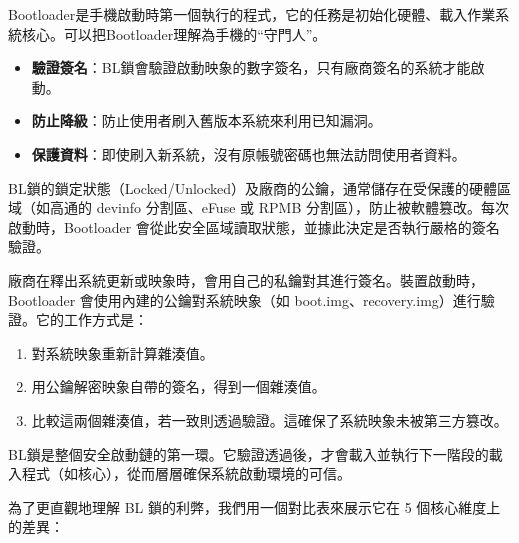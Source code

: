 


Bootloader是手機啟動時第一個執行的程式，它的任務是初始化硬體、載入作業系統核心。可以把Bootloader理解為手機的“守門人”。


\begin{itemize}
  \item \textbf{驗證簽名}：BL鎖會驗證啟動映象的數字簽名，只有廠商簽名的系統才能啟動。
  \item \textbf{防止降級}：防止使用者刷入舊版本系統來利用已知漏洞。
  \item \textbf{保護資料}：即使刷入新系統，沒有原帳號密碼也無法訪問使用者資料。
\end{itemize}


BL鎖的鎖定狀態（Locked/Unlocked）及廠商的公鑰，通常儲存在受保護的硬體區域（如高通的 devinfo 分割區、eFuse 或 RPMB 分割區），防止被軟體篡改。每次啟動時，Bootloader 會從此安全區域讀取狀態，並據此決定是否執行嚴格的簽名驗證。


廠商在釋出系統更新或映象時，會用自己的私鑰對其進行簽名。裝置啟動時，Bootloader 會使用內建的公鑰對系統映象（如 boot.img、recovery.img）進行驗證。它的工作方式是：

\begin{enumerate}
  \item 對系統映象重新計算雜湊值。
  \item 用公鑰解密映象自帶的簽名，得到一個雜湊值。
  \item 比較這兩個雜湊值，若一致則透過驗證。這確保了系統映象未被第三方篡改。
\end{enumerate}


BL鎖是整個安全啟動鏈的第一環。它驗證透過後，才會載入並執行下一階段的載入程式（如核心），從而層層確保系統啟動環境的可信。


為了更直觀地理解 BL 鎖的利弊，我們用一個對比表來展示它在 5 個核心維度上的差異：

